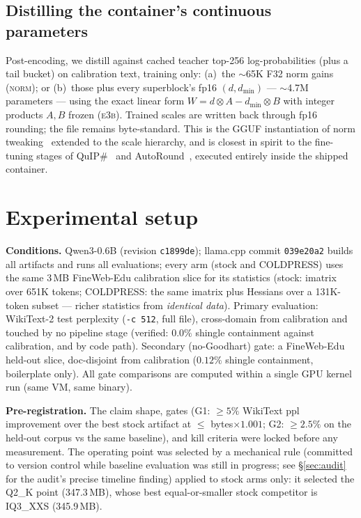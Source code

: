 \documentclass[11pt]{article}
\begin{document}
\subsection{Distilling the container's continuous parameters}
\label{sec:distill}

Post-encoding, we distill against cached teacher top-256 log-probabilities (plus a
tail bucket) on calibration text, training only: (a)~the $\sim$65K F32 norm gains
(\textsc{norm}); or (b)~those plus every superblock's fp16 $(d, d_{\min})$ ---
$\sim$4.7M parameters --- using the exact linear form $W = d \otimes A - d_{\min}
\otimes B$ with integer products $A, B$ frozen (\textsc{e3b}). Trained scales are
written back through fp16 rounding; the file remains byte-standard. This is the GGUF
instantiation of norm tweaking~\cite{normtweaking} extended to the scale hierarchy,
and is closest in spirit to the fine-tuning stages of QuIP\#~\cite{quipsharp} and
AutoRound~\cite{autoround}, executed entirely inside the shipped container.

\section{Experimental setup}
\label{sec:setup}

\textbf{Conditions.} Qwen3-0.6B (revision \texttt{c1899de}); llama.cpp commit
\texttt{039e20a2} builds all artifacts and runs all evaluations; every arm (stock and
COLDPRESS) uses the same 3\,MB FineWeb-Edu calibration slice for its statistics
(stock: imatrix over 651K tokens; COLDPRESS: the same imatrix plus Hessians over a
131K-token subset --- richer statistics from \emph{identical data}). Primary
evaluation: WikiText-2 test perplexity (\texttt{-c 512}, full file), cross-domain
from calibration and touched by no pipeline stage (verified: $0.0\%$ shingle
containment against calibration, and by code path). Secondary (no-Goodhart) gate:
a FineWeb-Edu held-out slice, doc-disjoint from calibration ($0.12\%$ shingle
containment, boilerplate only). All gate comparisons are computed within a single
GPU kernel run (same VM, same binary).

\textbf{Pre-registration.} The claim shape, gates (G1: $\geq5\%$ WikiText ppl
improvement over the best stock artifact at $\leq$ bytes$\times1.001$; G2: $\geq2.5\%$
on the held-out corpus vs the same baseline), and kill criteria were locked before any
measurement. The operating point was selected by a mechanical rule (committed to
version control while baseline evaluation was still in progress; see \S\ref{sec:audit}
for the audit's precise timeline finding) applied to stock arms only: it selected the
Q2\_K point (347.3\,MB), whose best equal-or-smaller stock competitor is IQ3\_XXS
(345.9\,MB).
\end{document}

